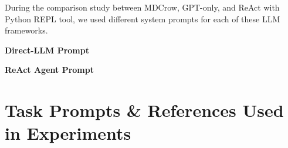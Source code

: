 \begin{minipage}{\linewidth}
During the comparison study between MDCrow, GPT-only, and ReAct with Python REPL tool, we used different system prompts for each of these LLM frameworks. 

\textbf{Direct-LLM Prompt}

\textbf{ReAct Agent Prompt}

\end{minipage}

\section{Task Prompts \& References Used in Experiments}
 

%
